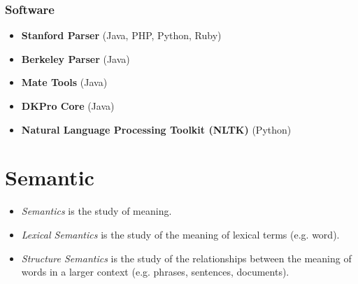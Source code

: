 \documentclass[a4paper, 11pt, accentcolor = tud3b]{tudreport}
\begin{document}
                \subsubsection{Software} %
                    \begin{itemize}
                    	\item \textbf{Stanford Parser} (Java, PHP, Python, Ruby)
                    	\item \textbf{Berkeley Parser} (Java)
                    	\item \textbf{Mate Tools} (Java)
                    	\item \textbf{DKPro Core} (Java)
                    	\item \textbf{Natural Language Processing Toolkit (NLTK)} (Python)
                    \end{itemize}

        \section{Semantic} %
            \begin{itemize}
            	\item \textit{Semantics} is the study of meaning.
            	\item \textit{Lexical Semantics} is the study of the meaning of lexical terms (e.g. word).
            	\item \textit{Structure Semantics} is the study of the relationships between the meaning of words in a larger context (e.g. phrases, sentences, documents).
            \end{itemize}
\end{document}
